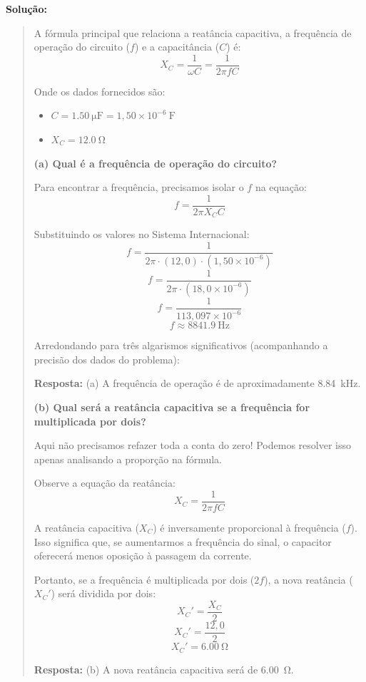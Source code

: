 \documentclass[12pt,a4paper]{article}
\newcommand{\resposta}[1]{\noindent\textbf{Resposta:} #1}
\begin{document}
\textbf{Solução:}
\begin{quote}
\noindent A fórmula principal que relaciona a reatância capacitiva, a frequência de operação do circuito ($f$) e a capacitância ($C$) é:
\[
X_C = \frac{1}{\omega C} = \frac{1}{2\pi f C}
\]

\vspace{0.2cm}
\noindent Onde os dados fornecidos são:
\begin{itemize}
    \item $C = \SI{1,50}{\micro\farad} = 1,50 \times 10^{-6}\ \text{F}$
    \item $X_C = \SI{12,0}{\ohm}$
\end{itemize}

\vspace{0.4cm}
\noindent \textbf{(a) Qual é a frequência de operação do circuito?}

\vspace{0.2cm}
\noindent Para encontrar a frequência, precisamos isolar o $f$ na equação:
\[
f = \frac{1}{2\pi X_C C}
\]

\noindent Substituindo os valores no Sistema Internacional:
\[
f = \frac{1}{2\pi \cdot (12,0) \cdot (1,50 \times 10^{-6})}
\]
\[
f = \frac{1}{2\pi \cdot (18,0 \times 10^{-6})}
\]
\[
f = \frac{1}{113,097 \times 10^{-6}}
\]
\[
f \approx \SI{8841,9}{\hertz}
\]

\noindent Arredondando para três algarismos significativos (acompanhando a precisão dos dados do problema):

\resposta{(a) A frequência de operação é de aproximadamente \SI{8,84}{\kilo\hertz}.}

\vspace{0.4cm}
\noindent \textbf{(b) Qual será a reatância capacitiva se a frequência for multiplicada por dois?}

\vspace{0.2cm}
\noindent Aqui não precisamos refazer toda a conta do zero! Podemos resolver isso apenas analisando a proporção na fórmula.

\noindent Observe a equação da reatância:
\[
X_C = \frac{1}{2\pi f C}
\]

\noindent A reatância capacitiva ($X_C$) é inversamente proporcional à frequência ($f$). Isso significa que, se aumentarmos a frequência do sinal, o capacitor oferecerá menos oposição à passagem da corrente.

\noindent Portanto, se a frequência é multiplicada por dois ($2f$), a nova reatância ($X_C'$) será dividida por dois:
\[
X_C' = \frac{X_C}{2}
\]
\[
X_C' = \frac{12,0}{2}
\]
\[
X_C' = \SI{6,00}{\ohm}
\]

\resposta{(b) A nova reatância capacitiva será de \SI{6,00}{\ohm}.}
\end{quote}
\end{document}
